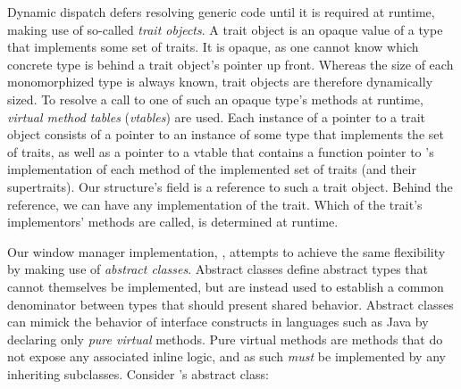 Dynamic dispatch defers resolving generic code until it is required at
runtime, making use of so-called \textit{trait objects}\cite{therustbook,
rustdynamicdispatch}. A trait object is an opaque value of a type that
implements some set of traits\cite{therustreference}. It is opaque,
as one cannot know which concrete type is behind a trait object's
pointer up front\cite{therustreference}. Whereas the size of each
monomorphized type is always known, trait objects are therefore dynamically
sized\cite{therustreference}. To resolve a call to one of such an opaque
type's methods at runtime, \textit{virtual method tables} (\textit{vtables})
are used\cite{therustreference}. Each instance of a pointer to a trait object
consists of a pointer to an instance of some type  that implements the
set of traits, as well as a pointer to a vtable that contains a function pointer
to 's implementation of each method of the implemented set of traits
(and their supertraits)\cite{therustreference}. Our  structure's
 field is a reference to such a trait object. Behind the reference,
we can have any implementation of the  trait. Which of the
trait's implementors' methods are called, is determined at runtime.



Our \cpp window manager implementation, \wmcpp, attempts to achieve the same
flexibility by making use of \textit{abstract classes}. Abstract classes define
abstract types that cannot themselves be implemented, but are instead used
to establish a common denominator between types that should present shared
behavior. Abstract classes can mimick the behavior of interface constructs in
languages such as Java by declaring only \textit{pure virtual} methods. Pure
virtual methods are methods that do not expose any associated inline logic, and
as such \textit{must} be implemented by any inheriting subclasses. Consider
\wmcpp's  abstract class:

